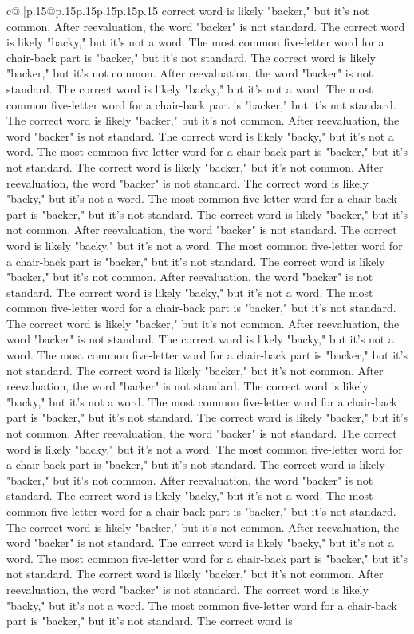 \documentclass{article}
\begin{document}
{\begin{supertabular}{c@{$\;$}|p{.15\linewidth}@{}p{.15\linewidth}p{.15\linewidth}p{.15\linewidth}p{.15\linewidth}p{.15\linewidth}}
{{{correct word is likely "backer," but it's not common. After reevaluation, the word "backer" is not standard. The correct word is likely "backy," but it's not a word. The most common five{-}letter word for a chair{-}back part is "backer," but it's not standard. The correct word is likely "backer," but it's not common. After reevaluation, the word "backer" is not standard. The correct word is likely "backy," but it's not a word. The most common five{-}letter word for a chair{-}back part is "backer," but it's not standard. The correct word is likely "backer," but it's not common. After reevaluation, the word "backer" is not standard. The correct word is likely "backy," but it's not a word. The most common five{-}letter word for a chair{-}back part is "backer," but it's not standard. The correct word is likely "backer," but it's not common. After reevaluation, the word "backer" is not standard. The correct word is likely "backy," but it's not a word. The most common five{-}letter word for a chair{-}back part is "backer," but it's not standard. The correct word is likely "backer," but it's not common. After reevaluation, the word "backer" is not standard. The correct word is likely "backy," but it's not a word. The most common five{-}letter word for a chair{-}back part is "backer," but it's not standard. The correct word is likely "backer," but it's not common. After reevaluation, the word "backer" is not standard. The correct word is likely "backy," but it's not a word. The most common five{-}letter word for a chair{-}back part is "backer," but it's not standard. The correct word is likely "backer," but it's not common. After reevaluation, the word "backer" is not standard. The correct word is likely "backy," but it's not a word. The most common five{-}letter word for a chair{-}back part is "backer," but it's not standard. The correct word is likely "backer," but it's not common. After reevaluation, the word "backer" is not standard. The correct word is likely "backy," but it's not a word. The most common five{-}letter word for a chair{-}back part is "backer," but it's not standard. The correct word is likely "backer," but it's not common. After reevaluation, the word "backer" is not standard. The correct word is likely "backy," but it's not a word. The most common five{-}letter word for a chair{-}back part is "backer," but it's not standard. The correct word is likely "backer," but it's not common. After reevaluation, the word "backer" is not standard. The correct word is likely "backy," but it's not a word. The most common five{-}letter word for a chair{-}back part is "backer," but it's not standard. The correct word is likely "backer," but it's not common. After reevaluation, the word "backer" is not standard. The correct word is likely "backy," but it's not a word. The most common five{-}letter word for a chair{-}back part is "backer," but it's not standard. The correct word is likely "backer," but it's not common. After reevaluation, the word "backer" is not standard. The correct word is likely "backy," but it's not a word. The most common five{-}letter word for a chair{-}back part is "backer," but it's not standard. The correct word is }}}
\end{supertabular}}
\end{document}
